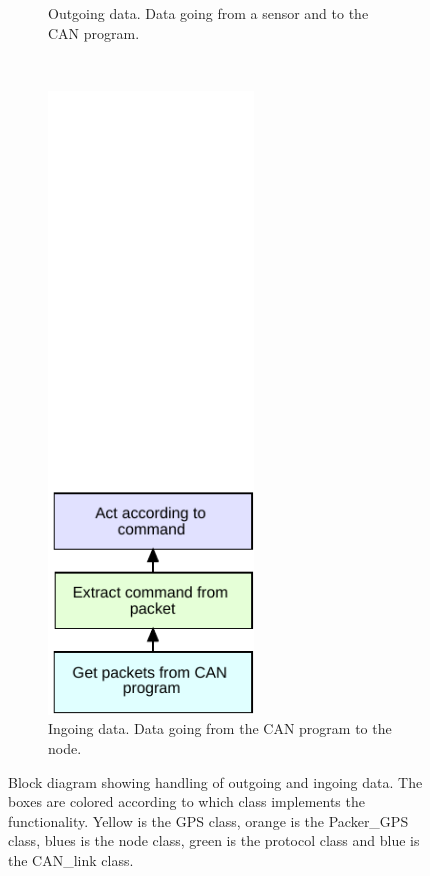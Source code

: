 \begin{figure}[!h]
\begin{subfigure}{0.45\textwidth}
        \caption{Outgoing data. Data going from a sensor and to the CAN program.}
        \label{fig:filter_1}
    \end{subfigure}
    ~
    \begin{subfigure}{0.45\textwidth}
    \centering
        \includegraphics[width=0.60\textwidth]{graphics/FlowChart_Node_Unpacking}
        \caption{Ingoing data. Data going from the CAN program to the node.}
        \label{fig:filter_2}
    \end{subfigure}
        \caption{Block diagram showing handling of outgoing and ingoing data. The boxes are colored according to which class implements the functionality. Yellow is the GPS class, orange is the Packer\_GPS class, blues is the node class, green is the protocol class and blue is the CAN\_link class.}
           \label{fig:filter_fulll}
\end{figure}


